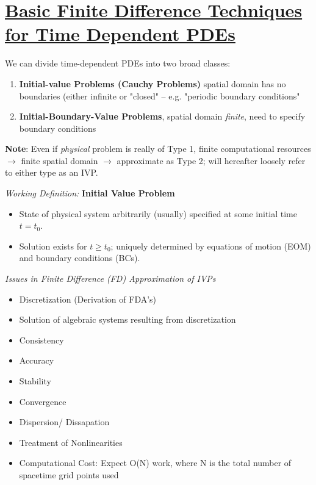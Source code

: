 \def \secname {Basic Finite Difference Techniques for Time Dependent PDEs}

\section[\secname]{\hyperlink{toc}{\secname}}


We can divide time-dependent PDEs into two broad classes:
\begin{enumerate}
    \item \textbf{Initial-value Problems (Cauchy Problems)} spatial domain has no boundaries (either infinite or "closed" -- e.g. "periodic boundary conditions"
    \item \textbf{Initial-Boundary-Value Problems}, spatial domain \textit{finite}, need to specify boundary conditions
\end{enumerate}

\textbf{Note}: Even if \textit{physical} problem is really of Type 1, finite computational resources $\rightarrow$ finite spatial domain $\rightarrow$ approximate as Type 2; will hereafter loosely refer to either type as an IVP. \newline

\textit{Working Definition:} \textbf{Initial Value Problem}
\begin{itemize}
    \item State of physical system arbitrarily (usually) specified at some initial time $t=t_0$.
    \item Solution exists for $t \ge t_0$; uniquely determined by equations of motion (EOM) and boundary conditions (BCs).
\end{itemize}

\textit{Issues in Finite Difference (FD) Approximation of IVPs}

\begin{itemize}
    \item Discretization (Derivation of FDA's)
    \item Solution of algebraic systems resulting from discretization
    \item Consistency
    \item Accuracy
    \item Stability
    \item Convergence
    \item Dispersion/ Dissapation
    \item Treatment of Nonlinearities
    \item Computational Cost: Expect O(N) work, where N is the total number of spacetime grid points used
\end{itemize}

